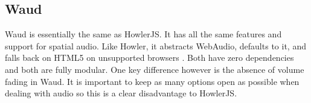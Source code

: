 \subsection{Waud}
Waud is essentially the same as HowlerJS. It has all the same features and support for spatial audio. Like Howler, it abstracts WebAudio, defaults to it, and falls back on HTML5 on unsupported browsers \cite{r16}. Both have zero dependencies and both are fully modular. One key difference however is the absence of volume fading in Waud. It is important to keep as many options open as possible when dealing with audio so this is a clear disadvantage to HowlerJS.

